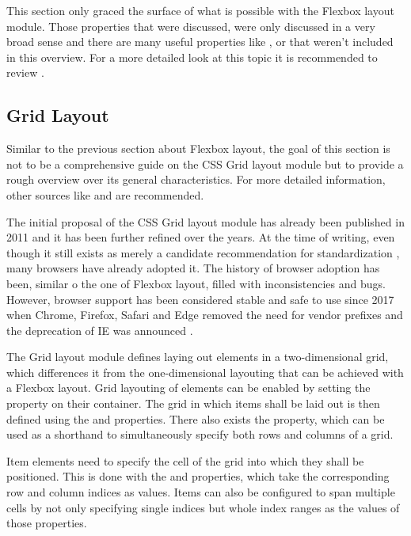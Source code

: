 This section only graced the surface of what is possible with the Flexbox layout module. 
Those properties that were discussed, were only discussed in a very broad sense and there are many useful properties like ,  or  that weren't included in this overview. 
For a more detailed look at this topic it is recommended to review \cite{CSSFlexbox}.

\subsection{Grid Layout}
\label{sec:Grid}

Similar to the previous section about Flexbox layout, the goal of this section is not to be a comprehensive guide on the CSS Grid layout module but to provide a rough overview over its general characteristics. 
For more detailed information, other sources like \cite{GridLayoutInCSS} and \cite{CSSGrid} are recommended.

The initial proposal of the CSS Grid layout module has already been published in 2011 \parencite{CSSGridFirstDraft} and it has been further refined over the years. 
At the time of writing, even though it still exists as merely a candidate recommendation for standardization \parencite{CSSGrid}, many browsers have already adopted it. 
The history of browser adoption has been, similar o the one of Flexbox layout, filled with inconsistencies and bugs. 
However, browser support has been considered stable and safe to use since 2017 when Chrome, Firefox, Safari and Edge removed the need for vendor prefixes and the deprecation of IE was announced \parencite{CanIUseCSSGrid}.

The Grid layout module defines laying out elements in a two-dimensional grid, which differences it from the one-dimensional layouting that can be achieved with a Flexbox layout. 
Grid layouting of elements can be enabled by setting the  property on their container. 
The grid in which items shall be laid out is then defined using the  and  properties. 
There also exists the  property, which can be used as a shorthand to simultaneously specify both rows and columns of a grid.

Item elements need to specify the cell of the grid into which they shall be positioned. 
This is done with the  and  properties, which take the corresponding row and column indices as values. 
Items can also be configured to span multiple cells by not only specifying single indices but whole index ranges as the values of those properties.

